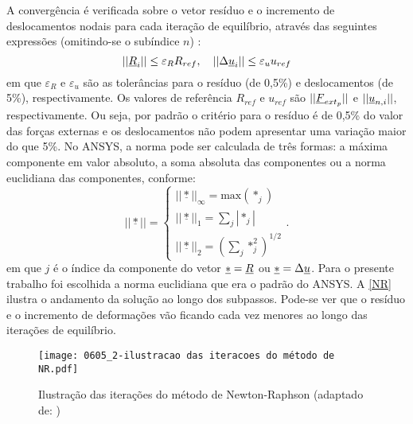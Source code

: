 A convergência é verificada sobre o vetor resíduo e o incremento de deslocamentos nodais para cada iteração de equilíbrio, através das seguintes expressões (omitindo-se o subíndice $n$) \cite[p. 667]{ANSYS2018}:
\begin{equation}
	\label{eq:convergencia}
	||\underline{R}_i|| \leq \varepsilon_R R_{ref},~~~ ||\Delta \underline u_i || \leq \varepsilon_u u_{ref}
\end{equation}
em que $\varepsilon_R$ e $\varepsilon_u$ são as tolerâncias para o resíduo (de 0,5\%) e deslocamentos (de 5\%), respectivamente. Os valores de referência $R_{ref}$ e $u_{ref}$ são $||\underline{F}_{ext_p}||$ e $||\underline u_{n,i}||$, respectivamente. Ou seja, por padrão o critério para o resíduo é de 0,5\% do valor das forças externas e os deslocamentos não podem apresentar uma variação maior do que 5\%. No ANSYS, a norma pode ser calculada de três formas: a máxima componente em valor absoluto, a soma absoluta das componentes ou a norma euclidiana das componentes, conforme:
\begin{equation}
	\label{eq:jacobiano_transformacao}
	||\underline *|| = \left\{
	\begin{array}{lcl}
		||\underline *||_\infty = \text{max}(*_j) \\
		||\underline *||_1 = \sum_{j}|*_j| \\
		||\underline *||_2 = (\sum_{j}*_j^2)^{1/2}
	\end{array}
	\right..
\end{equation}
em que $j$ é o índice da componente do vetor $\underline * = \underline{R}$ ou $\underline * = \Delta \underline u$. Para o presente trabalho foi escolhida a norma euclidiana que era o padrão do ANSYS. A \autoref{NR} ilustra o andamento da solução ao longo dos subpassos. Pode-se ver que o resíduo e o incremento de deformações vão ficando cada vez menores ao longo das iterações de equilíbrio.
\begin{figure}[H]
	\begin{center}
		\texttt{[image: 0605\_2-ilustracao das iteracoes do método de NR.pdf]}
	\end{center}
	\caption{\label{NR}Ilustração das iterações do método de Newton-Raphson (adaptado de: )}
\end{figure}

